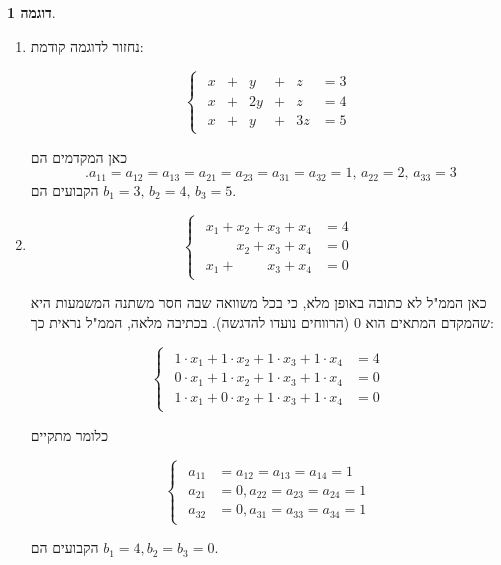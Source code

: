 \documentclass[12pt]{report}
\theoremstyle{plain}
\theoremstyle{definition}
\newtheorem{example}{דוגמה}[chapter]
\newcommand{\0}{\mathbf{0}}
\begin{document}
\begin{example}\
\begin{enumerate}[label=\alph*.]
\item
נחזור לדוגמה קודמת:

$$
\begin{cases}
\begin{alignedat}{7}
x &{}+{}&  y &{}+{}&  z &= 3 \\[4pt]
x &{}+{}& 2y &{}+{}&  z &= 4 \\[4pt]
x &{}+{}&  y &{}+{}& 3z &= 5
\end{alignedat}
\end{cases}
$$

כאן המקדמים הם 
$$
.a_{11}=a_{12}=a_{13}=a_{21}=a_{23}=a_{31}=a_{32}=1,\,a_{22}=2,\,a_{33}=3
$$
הקבועים הם $b_1=3,\,b_2=4,\,b_3=5$.

\item 
$$
\begin{cases}
\begin{aligned}
x_1 + x_2 + x_3 + x_4 &= 4 \\[4pt]
\phantom{x_1 + {}}x_2 + x_3 + x_4 &= 0 \\[4pt]
x_1 + \phantom{x_2 + {}}x_3 + x_4 &= 0
\end{aligned}
\end{cases}
$$

כאן הממ"ל לא כתובה באופן מלא, כי בכל משוואה שבה חסר משתנה המשמעות היא שהמקדם המתאים הוא
$0$
(הרווחים נועדו להדגשה).
בכתיבה מלאה, הממ"ל נראית כך:

$$
\begin{cases}
\begin{aligned}
1\cdot x_1 + 1\cdot x_2 +1\cdot x_3 +1\cdot x_4 &= 4 \\[4pt]
0\cdot x_1 +1\cdot x_2 +1\cdot x_3 +1\cdot x_4 &= 0 \\[4pt]
1\cdot x_1 + 0\cdot x_2 +1\cdot x_3 +1\cdot x_4 &= 0
\end{aligned}
\end{cases}
$$

כלומר מתקיים

$$
\begin{cases}
\begin{aligned}
a_{11} &= a_{12} = a_{13} = a_{14} = 1 \\[4pt]
a_{21} &= 0,a_{22} = a_{23} = a_{24} = 1 \\[4pt]
a_{32} &= 0, a_{31} = a_{33} = a_{34} = 1
\end{aligned}
\end{cases}
$$

הקבועים הם 
$b_1=4, b_2=b_3=0$.
\end{enumerate}
\end{example}
\end{document}
